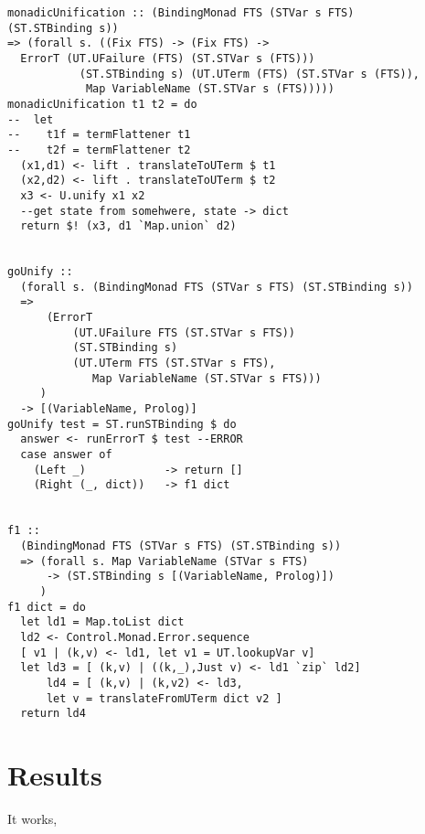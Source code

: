 \documentclass[thesis-solanki.tex]{subfiles}
\begin{document}
\begin{verbatim}
monadicUnification :: (BindingMonad FTS (STVar s FTS) 
(ST.STBinding s)) 
=> (forall s. ((Fix FTS) -> (Fix FTS) -> 
  ErrorT (UT.UFailure (FTS) (ST.STVar s (FTS)))
           (ST.STBinding s) (UT.UTerm (FTS) (ST.STVar s (FTS)),
            Map VariableName (ST.STVar s (FTS)))))
monadicUnification t1 t2 = do
--  let
--    t1f = termFlattener t1
--    t2f = termFlattener t2
  (x1,d1) <- lift . translateToUTerm $ t1
  (x2,d2) <- lift . translateToUTerm $ t2
  x3 <- U.unify x1 x2
  --get state from somehwere, state -> dict
  return $! (x3, d1 `Map.union` d2)


goUnify ::
  (forall s. (BindingMonad FTS (STVar s FTS) (ST.STBinding s))
  =>
      (ErrorT
          (UT.UFailure FTS (ST.STVar s FTS))
          (ST.STBinding s)
          (UT.UTerm FTS (ST.STVar s FTS),
             Map VariableName (ST.STVar s FTS)))
     )
  -> [(VariableName, Prolog)]
goUnify test = ST.runSTBinding $ do
  answer <- runErrorT $ test --ERROR
  case answer of
    (Left _)            -> return []
    (Right (_, dict))   -> f1 dict


f1 ::
  (BindingMonad FTS (STVar s FTS) (ST.STBinding s))
  => (forall s. Map VariableName (STVar s FTS)
      -> (ST.STBinding s [(VariableName, Prolog)])
     )
f1 dict = do
  let ld1 = Map.toList dict
  ld2 <- Control.Monad.Error.sequence 
  [ v1 | (k,v) <- ld1, let v1 = UT.lookupVar v]
  let ld3 = [ (k,v) | ((k,_),Just v) <- ld1 `zip` ld2]
      ld4 = [ (k,v) | (k,v2) <- ld3, 
      let v = translateFromUTerm dict v2 ]
  return ld4
\end{verbatim}



\section{Results}

It works,

 
\end{document}
